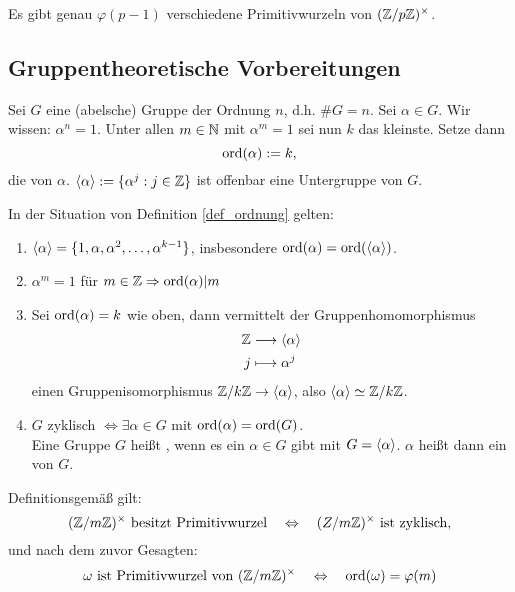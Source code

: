 	Es gibt genau $\varphi(p-1)$ verschiedene Primitivwurzeln von $(\mathbb{Z}/p\mathbb{Z})^\times$.

\subsection{Gruppentheoretische Vorbereitungen}
\begin{defn} \label{def_ordnung}
	Sei $G$ eine (abelsche) Gruppe der Ordnung $n$, d.h. $\#G = n$. Sei $\alpha \in G$. Wir wissen: $\alpha^n = 1$. Unter allen $m \in \mathbb{N}$ mit $\alpha^m = 1$ sei nun $k$ das kleinste. Setze dann
	\[ \operatorname{ord}(\alpha) := k, \]
	die  von $\alpha$. $\langle\alpha\rangle := \{\alpha^j : j \in \mathbb{Z}\}$ ist offenbar eine Untergruppe von $G$.
\end{defn}

\begin{lemma} \label{lemma_4.1}
	In der Situation von Definition \ref{def_ordnung} gelten: \begin{enumerate}[(1)]
		\item $\langle\alpha\rangle = \{1, \alpha, \alpha^2, \dots, \alpha^{k-1}\}$, insbesondere $\operatorname{ord}(\alpha) = \operatorname{ord}(\langle\alpha\rangle)$.
		\item $\alpha^m = 1$ für $m \in \mathbb{Z} \Rightarrow \operatorname{ord}(\alpha) | m$
		\item Sei $\operatorname{ord}(\alpha) = k$ wie oben, dann vermittelt der Gruppenhomomorphismus
		\begin{equation}
		\begin{aligned}
			\mathbb{Z} &\longrightarrow \langle\alpha\rangle \\
			j &\longmapsto \alpha^j
		\end{aligned}
		\end{equation}
		einen Gruppenisomorphismus $\mathbb{Z}/k\mathbb{Z} \rightarrow \langle\alpha\rangle$, also $\langle\alpha\rangle \simeq \mathbb{Z}/k\mathbb{Z}$.
		\item $G$ zyklisch $\Leftrightarrow \exists \alpha \in G$ mit $\operatorname{ord}(\alpha) = \operatorname{ord}(G)$. \\
		Eine Gruppe $G$ heißt , wenn es ein $\alpha \in G$ gibt mit $G = \langle\alpha\rangle$. $\alpha$ heißt dann ein  von $G$.
	\end{enumerate}
\end{lemma}

	Definitionsgemäß gilt:
	\[ (\mathbb{Z}/m\mathbb{Z})^\times \text{ besitzt Primitivwurzel} \quad \Leftrightarrow \quad (Z/m\mathbb{Z})^\times \text{ ist zyklisch}, \]
	und nach dem zuvor Gesagten:
	\[ \omega \text{ ist Primitivwurzel von } (\mathbb{Z}/m\mathbb{Z})^\times \quad \Leftrightarrow \quad \operatorname{ord}(\omega) = \varphi(m)\]
	
